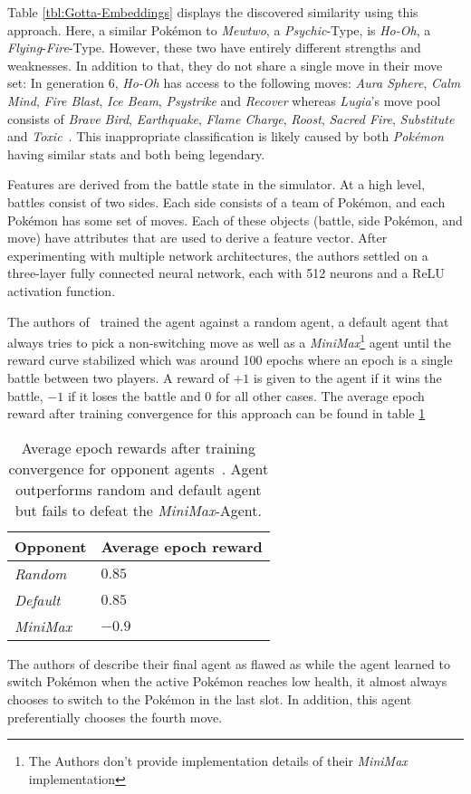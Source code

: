 Table \ref{tbl:Gotta-Embeddings} displays the discovered similarity using this approach. Here, a similar Pokémon
to \textit{Mewtwo}, a \textit{Psychic}-Type, is \textit{Ho-Oh}, a \textit{Flying}-\textit{Fire}-Type. However,
these two have entirely different strengths and weaknesses. In addition to that, they do not share a single
move in their move set: 
In generation 6, \textit{Ho-Oh} has access to the following moves: \textit{Aura Sphere}, \textit{Calm Mind}, 
\textit{Fire Blast}, \textit{Ice Beam}, \textit{Psystrike} and \textit{Recover} whereas \textit{Lugia}'s
move pool consists of \textit{Brave Bird}, \textit{Earthquake}, \textit{Flame Charge}, \textit{Roost},
\textit{Sacred Fire}, \textit{Substitute} and \textit{Toxic}~\autocite{DamageCalc:Gen6}. This inappropriate
classification is likely caused by both \textit{Pokémon} having similar stats and both being legendary.

Features are derived from the battle state in the simulator. At a high level, battles consist of two
sides. Each side consists of a team of Pokémon, and each Pokémon has some set of moves. Each of these 
objects (battle, side Pokémon, and move) have attributes that are used to derive a feature vector.
After experimenting with multiple network architectures, the authors settled on a three-layer 
fully connected neural network, each with 512 neurons and a ReLU activation function.

The authors of~\cite{GottaTrainEmAll} trained the agent against a random agent, a default agent 
that always tries to pick a non-switching move as well as a \textit{MiniMax}\footnote{The Authors don't
provide implementation details of their \textit{MiniMax} implementation} agent
until the reward curve stabilized which was around 100 epochs where an epoch is a single battle between
two players. A reward of $+1$ is given to the agent if it wins the battle, $-1$ if it loses the battle and
$0$ for all other cases. The average epoch reward after training convergence for this approach can
be found in table \ref{tbl:Gotta-Performance}
\begin{table}[h]
    \centering
        \begin{tabular}{|l|l|}
            \hline
            Opponent & Average epoch reward \\
            \hline
            \emph{Random} & $0.85$ \\
            \hline
            \emph{Default} & $0.85$ \\
            \hline
            \emph{MiniMax} & $-0.9$ \\
            \hline
        \end{tabular}
        \caption{Average epoch rewards after training convergence for opponent agents~\autocite{GottaTrainEmAll}. Agent
        outperforms random and default agent but fails to defeat the \textit{MiniMax}-Agent.}
        \label{tbl:Gotta-Performance}
\end{table}
The authors of \cite{GottaTrainEmAll} describe their final agent as flawed as while the agent learned 
to switch Pokémon when the active Pokémon reaches low health, it almost always chooses to switch to the
Pokémon in the last slot. In addition, this agent preferentially chooses the fourth move. 

